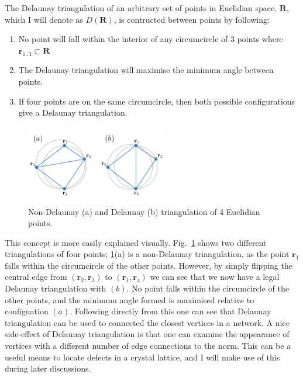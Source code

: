 The Delaunay triangulation of an arbitrary set of points in Euclidian space, $\mathbf{R}$, which I will denote as $D(\mathbf{R})$, is contructed between points by following:
\begin{enumerate}
    \item No point will fall within the interior of any circumcircle of 3 points where $\mathbf{r}_{1..3} \subset \mathbf{R}$
    \item The Delaunay triangulation will maximise the minimum angle between points.
    \item If four points are on the same circumcircle, then both possible configurations give a Delaunay triangulation.
\end{enumerate}

\begin{figure}\centering
    \includegraphics[width=0.55\textwidth]{Images/ch6_phasegineer/imgs/delaun}
    \caption{Non-Delaunay (a) and Delaunay (b) triangulation of 4 Euclidian points.}\label{fig:delaun}
\end{figure}
This concept is more easily explained visually. Fig.~\ref{fig:delaun} shows two different triangulations of four points;  \ref{fig:delaun}(a) is a non-Delaunay triangulation, as the point $\mathbf{r}_1$ falls within the circumcircle of the other points. However, by simply flipping the central edge from $(\mathbf{r}_2, \mathbf{r}_3)$ to $(\mathbf{r}_1, \mathbf{r}_4)$ we can see that we now have a legal Delaunay triangulation with $(b)$. No point falls within the circumcircle of the other points, and the minimum angle formed is maximised relative to configuation $(a)$. Following directly from this one can see that Delaunay triangulation can be used to connected the closest vertices in a network. A nice side-effect of Delaunay triangulation is that one can examine the appearance of vertices with a different number of edge connections to the norm. This can be a useful means to locate defects in a crystal lattice, and I will make use of this during later discussions.

